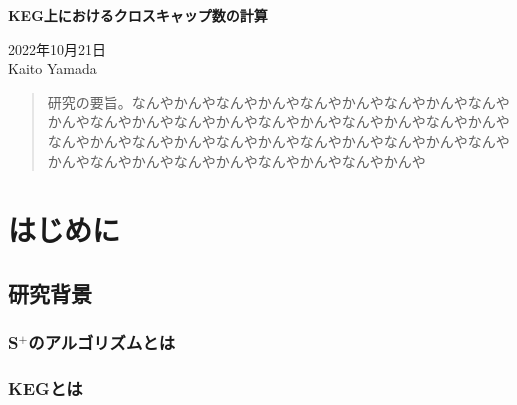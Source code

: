 \documentclass[11pt,a4j]{jreport}
\newcommand{\splus}{S${}^\text{+}$}
\begin{document}
\thispagestyle{empty}
\begin{center}

\vspace{40mm}
{\huge\noindent\textbf{KEG上におけるクロスキャップ数の計算}}\\
\vspace{20mm}

{\Large\noindent
2022年10月21日\\
\vspace{\baselineskip}
Kaito Yamada\\
}


\end{center}

\thispagestyle{empty}
\clearpage


\begin{abstract}
    研究の要旨。なんやかんやなんやかんやなんやかんやなんやかんやなんやかんやなんやかんやなんやかんやなんやかんやなんやかんやなんやかんやなんやかんやなんやかんやなんやかんやなんやかんやなんやかんやなんやかんやなんやかんやなんやかんやなんやかんやなんやかんや
\end{abstract}


\tableofcontents

\pagestyle{fancy}
\lhead{\rightmark}
\renewcommand{\chaptermark}[1]{\markboth{第\ \normalfont\thechapter\ 章~~#1}{}}


\chapter{はじめに} %

\section{研究背景} %
\subsection{\splus のアルゴリズムとは} %
\subsection{KEGとは} %
\end{document}

